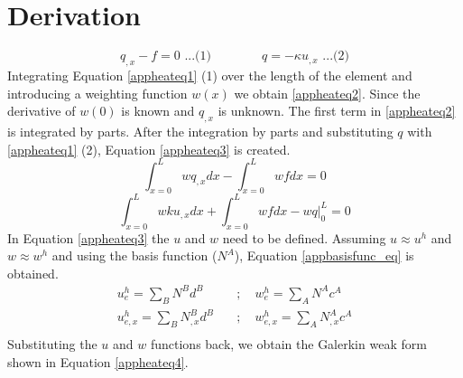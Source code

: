 \chapter{Derivation}\label{appder}
\begin{equation}
	q_{,x}-f = 0  \text{  ...(1)} \quad\quad\quad\quad q = -\kappa u_{,x} \text{  ...(2)} 
	\end{equation}
	Integrating Equation \ref{appheateq1} (1) over the length of the element and introducing a weighting function $w(x)$ we obtain \ref{appheateq2}. 
	Since the derivative of $w(0)$ is known and $q_{,x}$ is unknown. 
	The first term in \ref{appheateq2} is integrated by parts. 
	After the integration by parts and substituting $q$ with \ref{appheateq1} (2), Equation \ref{appheateq3} is created.
	\begin{equation}
	\int_{x=0}^L wq_{,x}dx - \int_{x=0}^L wfdx = 0
	\end{equation}
	\begin{equation}
	\int_{x=0}^L wku_{,x}dx + \int_{x=0}^L wfdx - \left.wq\right|_0^L = 0
	\end{equation}
	In Equation \ref{appheateq3} the $u$ and $w$ need to be defined.
	Assuming $u \approx u^h$ and $w \approx w^h$ and using the basis function ($N^A$), Equation \ref{appbasisfunc_eq} is obtained.
	\begin{equation}
	\label{appbasisfunc_eq}
	\begin{aligned}
	u_e^h = \sum_{B} N^B d^B  \quad &;\quad w_e^h = \sum_{A} N^A c^A\\
	u_{e,x}^h = \sum_{B} N_{,x}^B d^B \quad &;\quad w_{e,x}^h=\sum_A N_{,x}^A c^A\\
	\end{aligned}
	\end{equation}		
	Substituting the $u$ and $w$ functions back, we obtain the Galerkin weak form shown in Equation \ref{appheateq4}.

